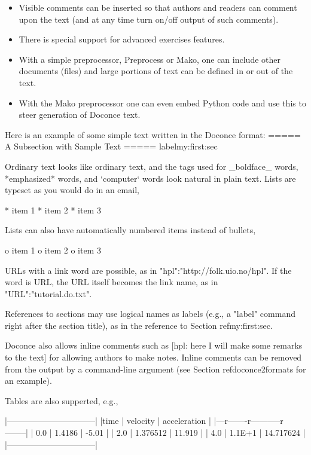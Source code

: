 \documentclass[twoside]{book}
\begin{document}
\begin{itemize}
  \item Visible comments can be inserted so that authors and readers can
    comment upon the text (and at any time turn on/off output of such
    comments).

  \item There is special support for advanced exercises features.

  \item With a simple preprocessor, Preprocess or Mako, one can include
    other documents (files) and large portions of text can be defined
    in or out of the text.

  \item With the Mako preprocessor one can even embed Python
    code and use this to steer generation of Doconce text.
\end{itemize}

\noindent
Here is an example of some simple text written in the Doconce format:
\bccq
===== A Subsection with Sample Text =====
label{my:first:sec}

Ordinary text looks like ordinary text, and the tags used for
_boldface_ words, *emphasized* words, and `computer` words look
natural in plain text.  Lists are typeset as you would do in an email,

  * item 1
  * item 2
  * item 3

Lists can also have automatically numbered items instead of bullets,

  o item 1
  o item 2
  o item 3

URLs with a link word are possible, as in "hpl":"http://folk.uio.no/hpl".
If the word is URL, the URL itself becomes the link name,
as in "URL":"tutorial.do.txt".

References to sections may use logical names as labels (e.g., a
"label" command right after the section title), as in the reference to
Section ref{my:first:sec}.

Doconce also allows inline comments such as [hpl: here I will make
some remarks to the text] for allowing authors to make notes. Inline
comments can be removed from the output by a command-line argument
(see Section ref{doconce2formats} for an example).

Tables are also supperted, e.g.,

  |--------------------------------|
  |time  | velocity | acceleration |
  |---r-------r-----------r--------|
  | 0.0  | 1.4186   | -5.01        |
  | 2.0  | 1.376512 | 11.919       |
  | 4.0  | 1.1E+1   | 14.717624    |
  |--------------------------------|
\end{document}
